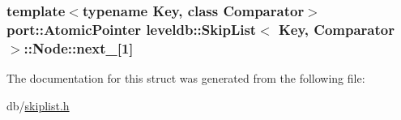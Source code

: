\subsubsection[{next\+\_\+}]{\setlength{\rightskip}{0pt plus 5cm}template$<$typename Key, class Comparator$>$ {\bf port\+::\+Atomic\+Pointer} {\bf leveldb\+::\+Skip\+List}$<$ {\bf Key}, {\bf Comparator} $>$\+::Node\+::next\+\_\+\mbox{[}1\mbox{]}\hspace{0.3cm}{\ttfamily [private]}}\label{structleveldb_1_1_skip_list_1_1_node_ab05b7bdbc2bd10c867f02ee8fcb347e2}


The documentation for this struct was generated from the following file\+:\begin{DoxyCompactItemize}
\item 
db/\hyperlink{skiplist_8h}{skiplist.\+h}\end{DoxyCompactItemize}
